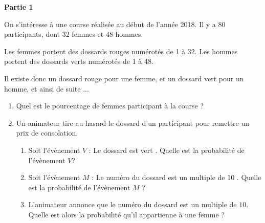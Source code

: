 
\medskip

\textbf{Partie 1}

\medskip

On s'intéresse à une course réalisée au début de l'année 2018. Il y a $80$ participants, dont $32$ femmes et $48$ hommes.

Les femmes portent des dossards rouges numérotés de 1 à 32. Les hommes portent des dossards verts numérotés de 1 à 48.

Il existe donc un dossard  rouge pour une femme, et un dossard  vert pour un homme, et ainsi de suite ...

\medskip

\begin{enumerate}
\item Quel est le pourcentage de femmes participant à la course ?
\item Un animateur tire au hasard le dossard d'un participant pour remettre un prix de consolation.
	\begin{enumerate}
		\item Soit l'évènement $V$ : \og Le dossard est vert \fg. Quelle est la probabilité de l'évènement $V$?
		\item Soit l'évènement $M$ : \og Le numéro du dossard est un multiple de 10 \fg. Quelle est la probabilité de l'évènement $M$ ?
		\item L'animateur annonce que le numéro du dossard est un multiple de $10$. Quelle est alors la probabilité qu'il appartienne à une femme ?
	\end{enumerate}
\end{enumerate}

\bigskip

